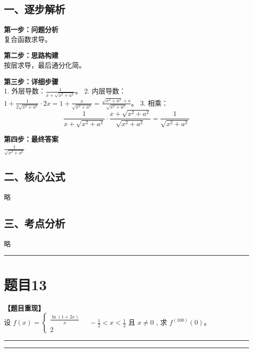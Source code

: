 \documentclass[12pt, a4paper]{ctexart}
\newcommand{\TopSeparator}{
    \par\noindent\rule{\textwidth}{1.5pt}\vspace{0.5em} %
}
\newcommand{\AnalysisSeparator}{
    \par\noindent\rule{\textwidth}{0.5pt}\vspace{0.2em}\hrule\vspace{0.5em} %
}
\newenvironment{RedAnalysis}{
    \par
    \color{red} %
}{
    \par
    \color{black} %
}
\begin{document}
\begin{RedAnalysis}

\subsection*{一、逐步解析}

\textbf{第一步：问题分析} \\
复合函数求导。

\textbf{第二步：思路构建} \\
按层求导，最后通分化简。

\textbf{第三步：详细步骤} \\
1. 外层导数：$\frac{1}{x + \sqrt{x^2+a^2}}$。
2. 内层导数：$1 + \frac{1}{2\sqrt{x^2+a^2}} \cdot 2x = 1 + \frac{x}{\sqrt{x^2+a^2}} = \frac{\sqrt{x^2+a^2}+x}{\sqrt{x^2+a^2}}$。
3. 相乘：
   \[ \frac{1}{x + \sqrt{x^2+a^2}} \cdot \frac{x + \sqrt{x^2+a^2}}{\sqrt{x^2+a^2}} = \frac{1}{\sqrt{x^2+a^2}} \]

\textbf{第四步：最终答案} \\
$\frac{1}{\sqrt{x^2+a^2}}$

\subsection*{二、核心公式}
略

\subsection*{三、考点分析}
略

\end{RedAnalysis}

\vspace{2em}

\TopSeparator
\section*{题目13}

\textbf{【题目重现】} \\
设 $ f(x)=\begin{cases}\frac{\ln(1+2x)}{x}\\2\end{cases} \quad -\frac{1}{2}<x<\frac{1}{2} $ 且 $ x\neq0 $ , 求 $ f^{(100)}(0) $。

\AnalysisSeparator
\end{document}
